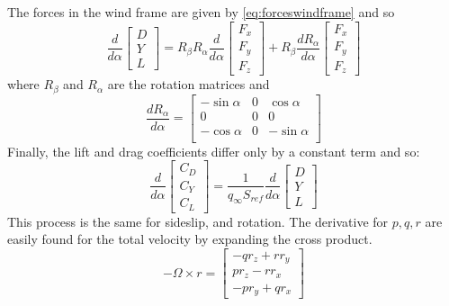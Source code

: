 \documentclass{article}
\begin{document}
The forces in the wind frame are given by \cref{eq:forceswindframe} and so
\begin{equation}
\frac{d }{d\alpha} \begin{bmatrix}
D\\
Y\\
L
\end{bmatrix} 
= R_\beta R_\alpha \frac{d }{d\alpha} 
\begin{bmatrix}
F_x\\
F_y\\
F_z
\end{bmatrix}
+ 
R_\beta \frac{d R_\alpha}{d\alpha} 
\begin{bmatrix}
F_x\\
F_y\\
F_z
\end{bmatrix}
\end{equation}
where $R_\beta$ and $R_\alpha$ are the rotation matrices and
\begin{equation}
\frac{d R_\alpha}{d\alpha}  =
\begin{bmatrix}
-\sin\alpha & 0 & \cos\alpha \\
0 & 0 & 0\\
-\cos\alpha & 0 & -\sin\alpha \\
\end{bmatrix}
\end{equation}
Finally, the lift and drag coefficients differ only by a constant term and so:
\begin{equation}
\frac{d }{d\alpha} 
\begin{bmatrix}
C_D\\
C_Y\\
C_L
\end{bmatrix} 
=
\frac{1}{q_\infty S_{ref}}
\frac{d }{d\alpha} 
\begin{bmatrix}
D\\
Y\\
L
\end{bmatrix} 
\end{equation}
This process is the same for sideslip, and rotation.  The derivative for $p, q, r$ are easily found for the total velocity by expanding the cross product.
\begin{equation}
- \Omega \times r = 
\begin{bmatrix}
- q r_z + r r_y\\
p r_z - r r_x\\
- p r_y + q r_x
\end{bmatrix}
\end{equation}
\end{document}
